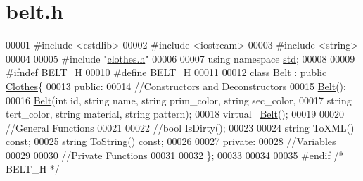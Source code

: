 \hypertarget{belt_8h_source}{}\section{belt.\+h}

\begin{DoxyCode}
00001 \textcolor{preprocessor}{#include <cstdlib>}
00002 \textcolor{preprocessor}{#include <iostream>}
00003 \textcolor{preprocessor}{#include <string>}
00004 
00005 \textcolor{preprocessor}{#include "\mbox{\hyperlink{clothes_8h}{clothes.h}}"}
00006 
00007 \textcolor{keyword}{using namespace }\mbox{\hyperlink{namespacestd}{std}};
00008 
00009 \textcolor{preprocessor}{#ifndef BELT\_H}
00010 \textcolor{preprocessor}{#define BELT\_H}
00011 
\mbox{\hyperlink{classBelt}{00012}} \textcolor{keyword}{class }\mbox{\hyperlink{classBelt}{Belt}} : \textcolor{keyword}{public} \mbox{\hyperlink{classClothes}{Clothes}}\{
00013   \textcolor{keyword}{public}:
00014     \textcolor{comment}{//Constructors and Deconstructors}
00015     \mbox{\hyperlink{classBelt}{Belt}}();
00016     \mbox{\hyperlink{classBelt}{Belt}}(\textcolor{keywordtype}{int} \textcolor{keywordtype}{id}, \textcolor{keywordtype}{string} name, \textcolor{keywordtype}{string} prim\_color, \textcolor{keywordtype}{string} sec\_color, 
00017           \textcolor{keywordtype}{string} tert\_color, \textcolor{keywordtype}{string} material, \textcolor{keywordtype}{string} pattern); 
00018     \textcolor{keyword}{virtual} ~\mbox{\hyperlink{classBelt}{Belt}}();
00019 
00020     \textcolor{comment}{//General Functions}
00021 
00022     \textcolor{comment}{//bool IsDirty();}
00023 
00024     \textcolor{keywordtype}{string} ToXML() \textcolor{keyword}{const};
00025     \textcolor{keywordtype}{string} ToString() \textcolor{keyword}{const};
00026   
00027   \textcolor{keyword}{private}:
00028     \textcolor{comment}{//Variables}
00029 
00030     \textcolor{comment}{//Private Functions}
00031 
00032 \};
00033 
00034 
00035 \textcolor{preprocessor}{#endif }\textcolor{comment}{/* BELT\_H */}\textcolor{preprocessor}{ }
\end{DoxyCode}
